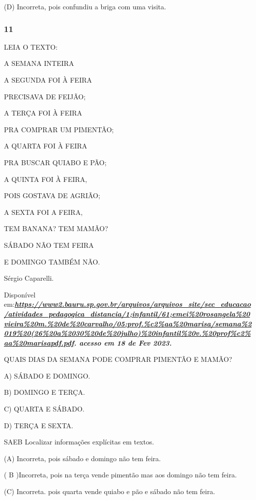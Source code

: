 (D) Incorreta, pois confundiu a briga com uma visita.

\subsubsection{11}\label{section-36}

LEIA O TEXTO:

A SEMANA INTEIRA

A SEGUNDA FOI À FEIRA

PRECISAVA DE FEIJÃO;

A TERÇA FOI À FEIRA

PRA COMPRAR UM PIMENTÃO;

A QUARTA FOI À FEIRA

PRA BUSCAR QUIABO E PÃO;

A QUINTA FOI À FEIRA,

POIS GOSTAVA DE AGRIÃO;

A SEXTA FOI A FEIRA,

TEM BANANA? TEM MAMÃO?

SÁBADO NÃO TEM FEIRA

E DOMINGO TAMBÉM NÃO.

Sérgio Caparelli.

Disponível
em:\textbf{\emph{\href{https://www2.bauru.sp.gov.br/arquivos/arquivos_site/sec_educacao/atividades_pedagogica_distancia/1;Infantil/61;EMEI\%20Rosangela\%20Vieira\%20M.\%20de\%20Carvalho/05;PROF.\%C2\%AA\%20MARISA/Semana\%2019\%20(26\%20a\%2030\%20de\%20Julho)\%20Infantil\%20V.\%20Prof\%C2\%AA\%20Marisapdf.pdf}{https://www2.bauru.sp.gov.br/arquivos/arquivos\_site/sec\_educacao/atividades\_pedagogica\_distancia/1;infantil/61;emei\%20rosangela\%20vieira\%20m.\%20de\%20carvalho/05;prof.\%c2\%aa\%20marisa/semana\%2019\%20(26\%20a\%2030\%20de\%20julho)\%20infantil\%20v.\%20prof\%c2\%aa\%20marisapdf.pdf}.
acesso em 18 de Fev 2023.}}

QUAIS DIAS DA SEMANA PODE COMPRAR PIMENTÃO E MAMÃO?

A) SÁBADO E DOMINGO.

B) DOMINGO E TERÇA.

C) QUARTA E SÁBADO.

D) TERÇA E SEXTA.

SAEB Localizar informações explícitas em textos.

(A) Incorreta, pois sábado e domingo não tem feira.

( B )Incorreta, pois na terça vende pimentão mas aos domingo não tem
feira.

(C) Incorreta. pois quarta vende quiabo e pão e sábado não tem feira.

